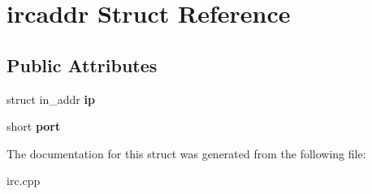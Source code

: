 \hypertarget{structircaddr}{}\section{ircaddr Struct Reference}
\label{structircaddr}
\subsection*{Public Attributes}
\begin{DoxyCompactItemize}
\item 
\mbox{\label{structircaddr_a746e13852c49e50e009196e92d80d6c3}} 
struct in\+\_\+addr {\bfseries ip}
\item 
\mbox{\label{structircaddr_a456ee45e96db52abd1aab925e6ddf5f6}} 
short {\bfseries port}
\end{DoxyCompactItemize}


The documentation for this struct was generated from the following file\+:\begin{DoxyCompactItemize}
\item 
irc.\+cpp\end{DoxyCompactItemize}
